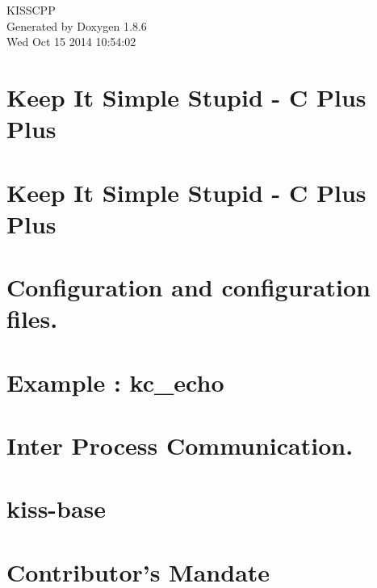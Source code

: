 \documentclass[twoside]{book}
\newcommand{\clearemptydoublepage}{%
  \newpage{\pagestyle{empty}\cleardoublepage}%
}
\begin{document}
\hypersetup{pageanchor=false}
\begin{titlepage}
\vspace*{7cm}
\begin{center}%
{\Large K\-I\-S\-S\-C\-P\-P }\\
\vspace*{1cm}
{\large Generated by Doxygen 1.8.6}\\
\vspace*{0.5cm}
{\small Wed Oct 15 2014 10:54:02}\\
\end{center}
\end{titlepage}
\clearemptydoublepage
\tableofcontents
\clearemptydoublepage
{}
\hypersetup{pageanchor=true}

\chapter{Keep It Simple Stupid -\/ C Plus Plus}
\label{index}\hypertarget{index}{}
\chapter{Keep It Simple Stupid -\/ C Plus Plus}
\label{md__r_e_a_d_m_e}
\hypertarget{md__r_e_a_d_m_e}{}

\chapter{Configuration and configuration files.}
\label{md_configuration}
\hypertarget{md_configuration}{}

\chapter{Example \-: kc\-\_\-echo}
\label{md_example_echo}
\hypertarget{md_example_echo}{}

\chapter{Inter Process Communication.}
\label{md_inter_process_communication}
\hypertarget{md_inter_process_communication}{}

\chapter{kiss-\/base}
\label{md_kiss-base}
\hypertarget{md_kiss-base}{}

\chapter{Contributor's Mandate}
\label{md_mandate}
\hypertarget{md_mandate}{}

\end{document}
